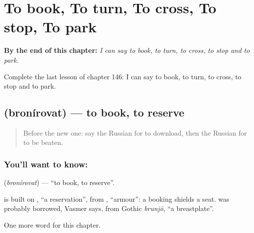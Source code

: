 
\chapter{To book, To turn, To cross, To stop, To park}
\label{ch:ru-to-book-to-turn-to-cross-to-stop-to-park}

\begin{chapteropening}
\textbf{By the end of this chapter:} \emph{I can say to book, to turn, to cross, to stop and to park.}

Complete the last lesson of chapter 146: I can say to book, to turn, to cross, to stop and to park.
\end{chapteropening}

\section[\texorpdfstring{\ru{бронировать} (bronírovat)}{бронировать (bronírovat)}]{ (bronírovat) — to book, to reserve}

\label{lesson:RU-C146-bronirovat}



\begin{quote}
Before the new one: say the Russian for to download, then the Russian for to be beaten.
\end{quote}

\subsection*{You'll want to know: }
\textbf{} (\emph{bronírovat}) — \textquotedblleft{}to book, to reserve\textquotedblright{}.

\begin{cousinweb}
\textbf{} is built on \emph{}, \textquotedblleft{}a reservation\textquotedblright{}, from \emph{}, \textquotedblleft{}armour\textquotedblright{}: a booking shields a seat. \emph{} was probably borrowed, Vasmer says, from Gothic \emph{brunjō}, \textquotedblleft{}a breastplate\textquotedblright{}.
\end{cousinweb}

\begin{grammarlens}[title={What you've built}]
One more word for this chapter.
\end{grammarlens}

